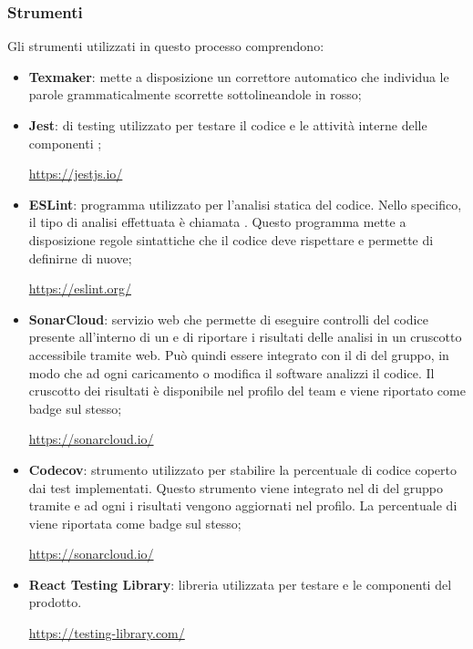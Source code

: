 \subsubsection{Strumenti}
Gli strumenti utilizzati in questo processo comprendono:
\begin{itemize}
	\item \textbf{Texmaker}: mette a disposizione un correttore automatico che individua le parole grammaticalmente scorrette sottolineandole in rosso;
	\item \textbf{Jest}:  di testing utilizzato per testare il codice  e le attività interne delle componenti ;
	\begin{center}
		\textcolor{blue}{\url{https://jestjs.io/}}
	\end{center}
	\item \textbf{ESLint}: programma utilizzato per l'analisi statica del codice. Nello specifico, il tipo di analisi effettuata è chiamata . Questo programma mette a disposizione regole sintattiche che il codice deve rispettare e permette di definirne di nuove;
	\begin{center}
		\textcolor{blue}{\url{https://eslint.org/}}
	\end{center}
	\item \textbf{SonarCloud}: servizio web che permette di eseguire controlli del codice presente all'interno di un  e di riportare i risultati delle analisi in un cruscotto accessibile tramite web. Può quindi essere integrato con il  di  del gruppo, in modo che ad ogni caricamento o modifica il software analizzi il codice. Il cruscotto dei risultati è disponibile nel profilo del team e viene riportato come badge sul  stesso;
	\begin{center}
		\textcolor{blue}{\url{https://sonarcloud.io/}}
	\end{center}
	\item \textbf{Codecov}: strumento utilizzato per stabilire la percentuale di codice coperto dai test implementati. Questo strumento viene integrato nel  di  del gruppo tramite  e ad ogni  i risultati vengono aggiornati nel profilo. La percentuale di  viene riportata come badge sul  stesso; 
	\begin{center}
		\textcolor{blue}{\url{https://sonarcloud.io/}}
	\end{center}
	\item \textbf{React Testing Library}: libreria utilizzata per testare e  le componenti  del prodotto.
	\begin{center}
		\textcolor{blue}{\url{https://testing-library.com/}}
	\end{center}	
\end{itemize}

